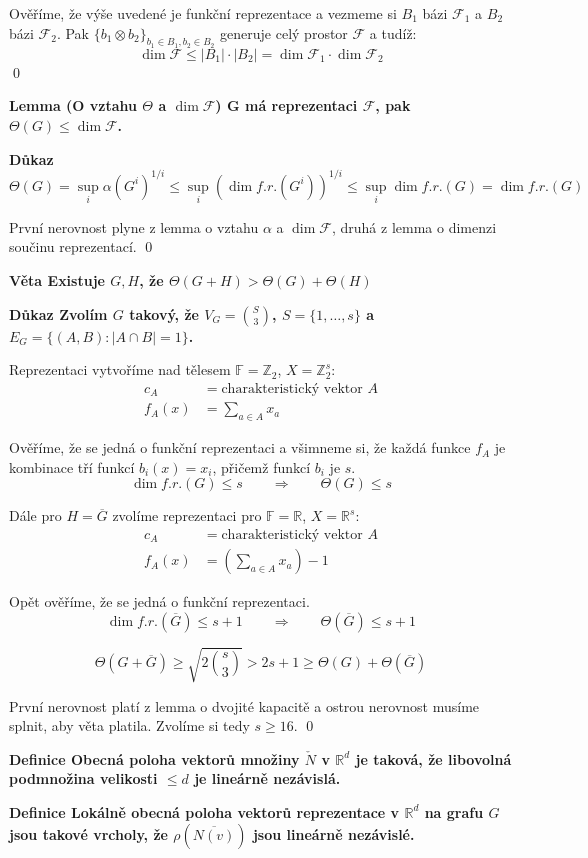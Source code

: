 \documentclass[a4paper,12pt,titlepage]{article}
\newcommand{\shn}{\Theta}
\newcommand{\lm}{\smallskip\noindent\bf Lemma\rm{} }
\newcommand{\dk}{\smallskip\noindent\bf Důkaz\rm{} }
\newcommand{\df}{\smallskip\noindent\bf Definice\rm{} }
\newcommand{\vt}{\smallskip\noindent\bf Věta\rm{} }
\newcommand{\F}{\mathcal{F}}
\newcommand{\Z}{\mathbb{Z}}
\newcommand{\R}{\mathbb{R}}
\newcommand{\Ft}{\mathbb{F}}
\begin{document}
Ověříme, že výše uvedené je funkční reprezentace a vezmeme si $B_1$ bázi
$\F_1$ a $B_2$ bázi $\F_2$. Pak $\{b_1 \otimes b_2\}_{b_1\in B_1, b_2\in
B_2}$ generuje celý prostor $\F$ a tudíž:
$$
	\dim\F \le |B_1|\cdot |B_2| = \dim\F_1 \cdot \dim\F_2
$$
\qed

\lm(O vztahu $\shn$ a $\dim\F$) G má reprezentaci $\F$, pak $\shn(G)
\leq \dim \F$.

\dk 
$$\shn(G) = \sup_i \alpha(G^i)^{1/i} \leq \sup_i(\dim f.r.(G^i))^{1/i} \leq \sup_i\dim f.r. (G) = \dim f.r.(G)$$

První nerovnost plyne z lemma o vztahu $\alpha$ a $\dim\F$, druhá z
lemma o dimenzi součinu reprezentací.
\qed


\vt Existuje $G, H$, že $\shn(G+H) > \shn(G) + \shn(H)$

\dk Zvolím $G$ takový, že $V_G={S\choose 3}$, $S = \{1, \dots, s\}$ a $E_G = \{ (A, B): |A\cap B| = 1\}$. 

Reprezentaci vytvoříme nad tělesem $\Ft = \Z_2$, $X = \Z_2^s$:
\begin{align*}
	c_A &= \text{charakteristický vektor } A \\ 
	f_A(x) &= \sum_{a\in A} x_a
\end{align*}

Ověříme, že se jedná o funkční reprezentaci a všimneme si, že každá
funkce $f_A$ je kombinace tří funkcí $b_i(x) = x_i$, přičemž funkcí
$b_i$ je $s$.
$$
\dim f.r.(G) \le s \qquad\Rightarrow\qquad \shn(G) \le s
$$

Dále pro $H = \overline G$ zvolíme reprezentaci pro $\Ft = \R$, $X =
\R^s$:
\begin{align*}
	c_A &= \text{charakteristický vektor } A \\ 
	f_A(x) &= (\sum_{a\in A} x_a) - 1
\end{align*}

Opět ověříme, že se jedná o funkční reprezentaci.
$$
\dim f.r.(\overline G) \le s+1 \qquad\Rightarrow\qquad \shn(\overline G) \le s+1
$$

$$\shn(G + \overline G) \ge \sqrt{2{s\choose 3}} > 2s+1 \ge \shn(G) + \shn(\overline G)$$

První nerovnost platí z lemma o dvojité kapacitě a ostrou nerovnost
musíme splnit, aby věta platila. Zvolíme si tedy $s \ge 16$.
\qed

\df Obecná poloha vektorů množiny $\check N$ v  $\R^d$ je taková, že libovolná podmnožina velikosti $\leq d$ je lineárně nezávislá.

\df Lokálně obecná poloha vektorů reprezentace v $\R^d$ na grafu $G$ jsou takové vrcholy, že $\rho(\overline{N(v)})$ jsou lineárně nezávislé.
\end{document}
